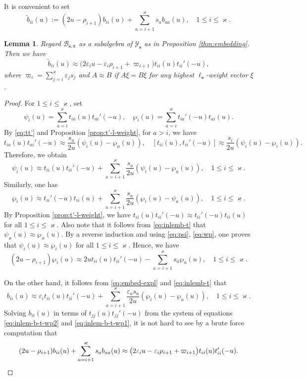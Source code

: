 \documentclass[11pt,reqno]{amsart}
\numberwithin{equation}{section}
\newtheorem{lem}[thm]{Lemma}
\theoremstyle{definition}
\theoremstyle{remark}
\newcommand{\beq}{\begin{equation}}
\newcommand{\eeq}{\end{equation}}
\newcommand{\tl}{\tilde}
\newcommand{\lle}{\leqslant}
\newcommand{\YMN}{{\mathscr{Y}_{\bm s}}}
\newcommand{\BMN}{{\mathscr{B}_{\bm s,\bm \ve}}}
\newcommand{\ka}{\varkappa}
\newcommand{\ve}{\varepsilon}
\newcommand{\s}{{\bm s}}
\begin{document}
It is convenient to set
\beq\label{eq:def-tl-b}
\tl b_{ii}(u):=(2u-\rho_{i+1})b_{ii}(u)+\sum_{a=i+1}^\ka s_ab_{aa}(u),\quad 1\lle i\lle \ka.
\eeq
\begin{lem}\label{lem:b-in-t}
Regard $\BMN$ as a subalgebra of $\YMN$ as in Proposition \ref{thm:embedding}. Then we have
\beq
\tl b_{ii}(u)\approx \big(2\ve_i u-\ve_i\rho_{i+1}+\varpi_{i+1}\big)t_{ii}(u)t_{ii}'(-u),
\eeq
where $\varpi_{i}=\sum_{j=i}^{\ka}\ve_js_j$ and $A \approx B$ if $A\xi =B\xi$ for any highest $\ell_\s$-weight vector $\xi$.
\end{lem}
\begin{proof}
For $1\lle i\lle \ka$, set
\[
\psi_i(u)=\sum_{a=i}^\ka t_{ia}(u)t_{ai}'(-u),\quad \wp_i(u)=\sum_{a=i}^\ka t_{ia}'(-u)t_{ai}(u).
\]
By \eqref{eq:tt'} and Proposition \ref{prop:t'-l-weight}, for $a>i$, we have
\beq\label{eq:inlemb-t}
t_{ia}(u)t_{ai}'(-u)\approx \frac{s_a}{2u}(\psi_i(u)-\wp_a(u)),\quad [t_{ii}(u),t_{ii}'(-u)]\approx\frac{s_i}{2u}(\psi_i(u)-\wp_i(u)).
\eeq
Therefore, we obtain
\beq\label{eq:psi}
\psi_i(u)\approx t_{ii}(u)t_{ii}'(-u)+\sum_{a=i+1}^\ka \frac{s_a}{2u}(\psi_i(u)-\wp_a(u)),\quad 1\lle i\lle \ka.
\eeq
Similarly, one has
\beq\label{eq:wp}
\wp_i(u)\approx t_{ii}'(-u)t_{ii}(u)+\sum_{a=i+1}^\ka\frac{s_a}{2u}(\wp_i(u)-\psi_a(u)),\quad 1\lle i\lle \ka.
\eeq
By Proposition \ref{prop:t'-l-weight}, we have $t_{ii}(u)t_{ii}'(-u)\approx t_{ii}'(-u)t_{ii}(u)$ for all $1\lle i\lle \ka$. Also note that it follows from \eqref{eq:inlemb-t} that $\psi_\ka(u)\approx \wp_\ka(u)$. By a reverse induction and using \eqref{eq:psi}, \eqref{eq:wp}, one proves that $\psi_i(u)\approx \wp_i(u)$ for all $1\lle i\lle \ka$. Hence, we have
\beq\label{eq:inlem-b-t-wp2}
(2u-\rho_{i+1})\wp_i(u)\approx 2ut_{ii}(u)t_{ii}'(-u)-\sum_{a=i+1}^\ka s_a \wp_a(u),\quad 1\lle i\lle \ka.
\eeq

On the other hand, it follows from \eqref{eq:embed-expl} and \eqref{eq:inlemb-t} that
\beq\label{eq:inlem-b-t-wp1}
b_{ii}(u)\approx \ve_i t_{ii}(u)t_{ii}'(-u) +\sum_{a=i+1}^\ka \frac{\ve_as_a}{2u}(\wp_i(u)-\wp_a(u)),\quad 1\lle i\lle \ka.
\eeq
Solving $b_{ii}(u)$ in terms of $t_{jj}(u)t_{jj}'(-u)$ from the system of equations \eqref{eq:inlem-b-t-wp2} and \eqref{eq:inlem-b-t-wp1}, it is not hard  to see by a brute force computation that
\[
(2u-\rho_{i+1})b_{ii}(u)+\sum_{a=i+1}^\ka s_ab_{aa}(u)\approx \big(2\ve_i u-\ve_i\rho_{i+1}+\varpi_{i+1}\big)t_{ii}(u)t_{ii}'(-u).\qedhere
\]
\end{proof}
\end{document}
